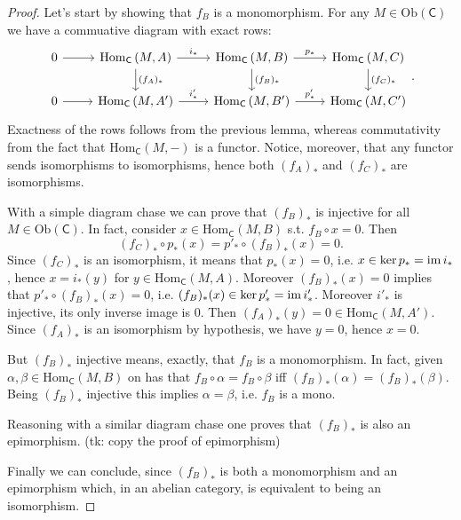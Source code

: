 \documentclass[../Main]{subfiles}
\begin{document}
\begin{proof}
	Let's start by showing that $f_B$ is a monomorphism.
	For any $M \in \mathrm{Ob} \left(\mathsf{C}\right)$ we have a commuative diagram
	with exact rows:
	\begin{equation}
	\begin{tikzcd}
		0 \arrow[r, "", rightarrow] &
		\mathrm{Hom}_{\mathsf{C}} \left( M, A \right) \arrow[r, "i_*", rightarrow] 
		\arrow[d, "(f_A)_*", rightarrow] &
		\mathrm{Hom}_{\mathsf{C}} \left( M, B \right) \arrow[r, "p_*", rightarrow] 
		\arrow[d, "(f_B)_*", rightarrow] &
		\mathrm{Hom}_{\mathsf{C}} \left( M, C \right)
		\arrow[d, "(f_C)_*", rightarrow] \\
		0 \arrow[r, "", rightarrow] &
		\mathrm{Hom}_{\mathsf{C}} \left( M, A' \right) \arrow[r, "i'_*", rightarrow] &
		\mathrm{Hom}_{\mathsf{C}} \left( M, B' \right) \arrow[r, "p'_*", rightarrow] &
		\mathrm{Hom}_{\mathsf{C}} \left( M, C' \right)
	\end{tikzcd}
	.\end{equation} 
	Exactness of the rows follows from the previous lemma, whereas commutativity from
	the fact that $\mathrm{Hom}_{\mathsf{C}} \left( M, - \right)$ is a functor.
	Notice, moreover, that any functor sends isomorphisms to isomorphisms, hence
	both $(f_A)_*$ and $(f_C)_*$ are isomorphisms.

	With a simple diagram chase we can prove that
	$\left( f_B \right)_*$ is injective for all $M \in \mathrm{Ob} \left(\mathsf{C}\right)$.
	In fact, consider $x \in \mathrm{Hom}_{\mathsf{C}} \left( M, B \right)$
	s.t. $f_B \circ x = 0$.
	Then 
	\begin{equation}
	(f_C)_* \circ p_* (x) = p'_* \circ (f_B)_* (x) = 0
	.\end{equation} 
	Since $\left( f_C \right)_*$ is an isomorphism, it means that $p_*(x) = 0$, i.e.
	$x \in \ker p_* = \operatorname{im} i_*$, hence $x = i_*(y)$ for $y \in \mathrm{Hom}_{\mathsf{C}} \left( M, A \right)$.
	Moreover $\left( f_B \right)_* (x) = 0$ implies that $p'_* \circ (f_B)_* (x) = 0$,
	i.e. $(f_B)_*(x) \in \ker p'_* = \operatorname{im} i'_*$.
	Moreover $i'_*$ is injective, its only inverse image is $0$.
	Then $(f_A)_*(y) = 0 \in \mathrm{Hom}_{\mathsf{C}} \left( M, A' \right)$.
	Since $\left( f_A \right)_*$ is an isomorphism by hypothesis, we have $y = 0$, hence $x = 0$.

	But $\left( f_B \right)_*$ injective means, exactly, that $f_B$ is a monomorphism.
	In fact, given $\alpha, \beta \in \mathrm{Hom}_{\mathsf{C}} \left( M, B \right)$
	on has that $f_B \circ \alpha = f_B \circ \beta$ iff
	$\left( f_B \right)_* (\alpha) = \left( f_B \right)_* (\beta)$.
	Being $(f_B)_*$ injective this implies $\alpha = \beta$, i.e. $f_B$ is a mono.

	Reasoning with a similar diagram chase one proves that $(f_B)_*$
	is also an epimorphism.
	(tk: copy the proof of epimorphism)

	Finally we can conclude, since $\left( f_B \right)_*$ is both a monomorphism
	and an epimorphism
	which, in an abelian category, is equivalent to being an isomorphism.
\end{proof}
\end{document}
